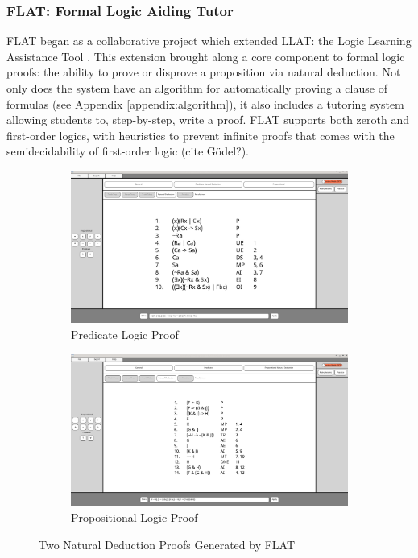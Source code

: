 \documentclass[ms]{uncgdissertationexp2}
\theoremstyle{plain}
\theoremstyle{definition}
\theoremstyle{remark}
\begin{document}
\subsubsection{FLAT: Formal Logic Aiding Tutor} \label{section:flat}
FLAT began as a collaborative project which extended LLAT: the Logic Learning Assistance Tool \cite{llat}. This extension brought along a core component to formal logic proofs: the ability to prove or disprove a proposition via natural deduction. Not only does the system have an algorithm for automatically proving a clause of formulas (see Appendix \ref{appendix:algorithm}), it also includes a tutoring system allowing students to, step-by-step, write a proof. FLAT supports both zeroth and first-order logics, with heuristics to prevent infinite proofs that comes with the semidecidability of first-order logic (cite G\"odel?).

\begin{figure}[!ht]
	\centering
	\begin{subfigure}{.5\textwidth}
		\centering
        \includegraphics[width=0.9\linewidth]{flat1.png}
		\caption{Predicate Logic Proof}
		\label{fig:flat1}
	\end{subfigure}%
	\begin{subfigure}{.5\textwidth}
		\centering
		\includegraphics[width=0.9\linewidth]{flat2.png}
		\caption{Propositional Logic Proof}
		\label{fig:flat2}
	\end{subfigure}
	\caption{Two Natural Deduction Proofs Generated by FLAT}
	\label{fig:flatfigures}
\end{figure}
\end{document}
